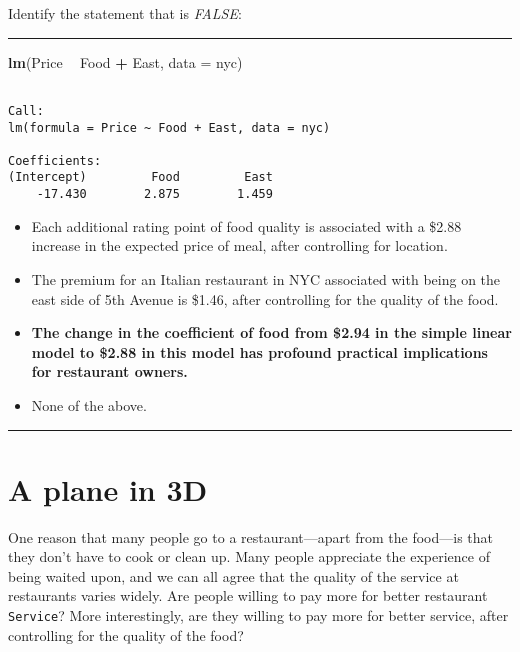 \documentclass[]{book}
\newenvironment{Shaded}{\begin{snugshade}}{\end{snugshade}}
\newcommand{\KeywordTok}[1]{\textcolor[rgb]{0.13,0.29,0.53}{\textbf{#1}}}
\newcommand{\DataTypeTok}[1]{\textcolor[rgb]{0.13,0.29,0.53}{#1}}
\newcommand{\StringTok}[1]{\textcolor[rgb]{0.31,0.60,0.02}{#1}}
\newcommand{\OperatorTok}[1]{\textcolor[rgb]{0.81,0.36,0.00}{\textbf{#1}}}
\newcommand{\NormalTok}[1]{#1}
\begin{document}
Identify the statement that is \emph{FALSE}:

\begin{center}\rule{0.5\linewidth}{\linethickness}\end{center}

\begin{Shaded}
\begin{Highlighting}[]
\KeywordTok{lm}\NormalTok{(Price }\OperatorTok{~}\StringTok{ }\NormalTok{Food }\OperatorTok{+}\StringTok{ }\NormalTok{East, }\DataTypeTok{data =}\NormalTok{ nyc)}
\end{Highlighting}
\end{Shaded}

\begin{verbatim}

Call:
lm(formula = Price ~ Food + East, data = nyc)

Coefficients:
(Intercept)         Food         East  
    -17.430        2.875        1.459  
\end{verbatim}

\begin{itemize}
\item
  Each additional rating point of food quality is associated with a
  \$2.88 increase in the expected price of meal, after controlling for
  location.
\item
  The premium for an Italian restaurant in NYC associated with being on
  the east side of 5th Avenue is \$1.46, after controlling for the
  quality of the food.
\item
  \textbf{The change in the coefficient of food from \$2.94 in the
  simple linear model to \$2.88 in this model has profound practical
  implications for restaurant owners.}
\item
  None of the above.
\end{itemize}

\begin{center}\rule{0.5\linewidth}{\linethickness}\end{center}

\section{A plane in 3D}\label{a-plane-in-3d}

One reason that many people go to a restaurant---apart from the
food---is that they don't have to cook or clean up. Many people
appreciate the experience of being waited upon, and we can all agree
that the quality of the service at restaurants varies widely. Are people
willing to pay more for better restaurant \texttt{Service}? More
interestingly, are they willing to pay more for better service, after
controlling for the quality of the food?
\end{document}
